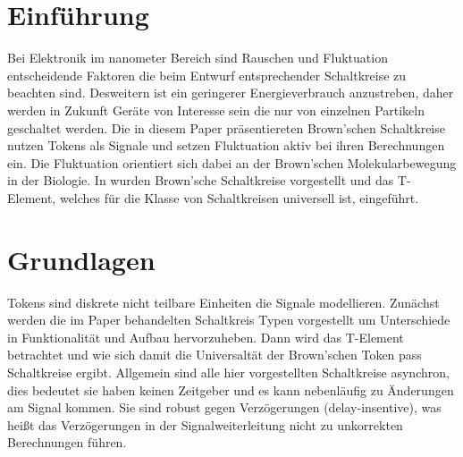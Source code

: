 \documentclass[11pt,a4paper]{article}
\begin{document}
\clearpage

\section{Einführung}
Bei Elektronik im nanometer Bereich sind Rauschen und Fluktuation 
entscheidende Faktoren die beim Entwurf entsprechender Schaltkreise 
zu beachten sind.
%
Desweitern ist ein geringerer Energieverbrauch anzustreben, daher 
werden in Zukunft Geräte von Interesse sein die nur von einzelnen 
Partikeln geschaltet werden.
%
Die in diesem Paper präsentiereten Brown'schen Schaltkreise nutzen Tokens
als Signale und setzen Fluktuation aktiv bei ihren Berechnungen ein.
Die Fluktuation orientiert sich dabei an der Brown'schen Molekularbewegung 
in der Biologie.
%
In \cite{Peper_Fundamentals_2013} wurden Brown'sche Schaltkreise 
vorgestellt und das T-Element, welches für die Klasse von Schaltkreisen 
universell ist, eingeführt.



\section{Grundlagen}
Tokens sind diskrete nicht teilbare Einheiten die Signale modellieren.
%
Zunächst werden die im Paper behandelten Schaltkreis Typen vorgestellt 
um Unterschiede in Funktionalität und Aufbau hervorzuheben. 
%
Dann wird das T-Element betrachtet und wie sich damit die Universaltät der
Brown'schen Token pass Schaltkreise ergibt.
%
Allgemein sind alle hier vorgestellten Schaltkreise asynchron,
dies bedeutet sie haben keinen Zeitgeber und es kann nebenläufig zu 
Änderungen am Signal kommen.
%
Sie sind robust gegen Verzögerungen (delay-insentive),
was heißt das Verzögerungen in der Signalweiterleitung 
nicht zu unkorrekten Berechnungen führen.
\end{document}
